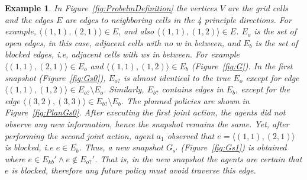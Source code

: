 \documentclass[letterpaper]{article} %
\def\
UrlFont{\rm}  %
\newtheorem{example}{Example}[section] %
\newcommand{\eo}{E_{o}} %
\newcommand{\eb}{E_{b}} %
\newcommand{\eko}{E_{ko}} %
\newcommand{\ekb}{E_{kb}} %
\newcommand{\eao}{E_{o?}} %
\newcommand{\eab}{E_{b?}} %
\theoremstyle{definition}
\begin{document}


\begin{example}
In Figure~\ref{fig:ProbelmDefinition} the vertices $V$ are the grid cells and the edges $E$ are edges to neighboring cells in the 4 principle directions. For example, $\langle (1,1) , (2,1)\rangle \in E$, and also $\langle (1,1) , (1,2)\rangle \in E$. $\eo$ is the set of open edges, in this case, adjacent cells with no w in between, and $\eb$ is the set of blocked edges, i.e, adjacent cells with ws in between. For example $\langle (1,1) , (2,1)\rangle \in \eo$ and $\langle (1,1) , (1,2)\rangle \in \eb$ (Figure~\ref{fig:G}).
In the first snapshot (Figure~\ref{fig:Gs0}), $\eao$ is almost identical to the true $\eo$ except for edge $\langle (1,1), (1,2) \rangle \in \eao \setminus \eo$. Similarly, $\eab$ contains  edges in $\eb$, except for the edge $\langle (3,2), (3,3) \rangle \in \eab \setminus \eb$.
The planned policies are shown in Figure~\ref{fig:PlanGs0}. After executing the first joint action, the agents did not observe any new information, hence the snapshot remains the same. Yet, after performing the second joint action, agent $a_1$ observed that $e=\langle (1,1) , (2,1)\rangle$ is blocked, i.e $e \in \eb$. Thus, a new snapshot $G_{s'}$ (Figure~\ref{fig:Gs1}) is obtained where $e \in \ekb' \land e \notin \eao'$. That is, in the new snapshot the agents are certain that $e$ is blocked, therefore any future policy must avoid traverse this edge.
\end{example}
\end{document}
